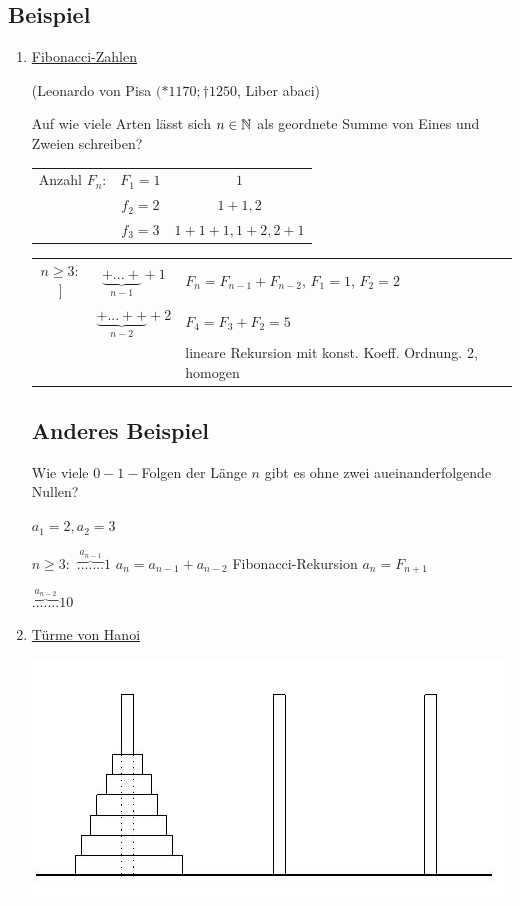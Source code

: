 \subsection{Beispiel}
\begin{enumerate}
	\item \underline{Fibonacci-Zahlen}
	
	(Leonardo von Pisa $(*1170 ; \dagger1250$, Liber abaci)
	
	Auf wie viele Arten lässt sich $n \in \operatorname{\mathbb{N}}$ als geordnete Summe von Eines und Zweien schreiben?
	
	
	\begin{tabular}{c c c}
		Anzahl $F_n$:	& $F_1=1$ 	& $1$\\
						& $f_2=2$	& $1+1,2$\\
						& $f_3=3$	& $1+1+1,1+2,2+1$\\
	\end{tabular}
	
	\begin{tabular}{c c l}
		$n\geq 3:$] 	&$\underbrace{+...+}_{n-1}+1$ & $F_n = F_{n-1}+F_{n-2}$, $F_1=1$, $F_2=2$\\
						&$\underbrace{+...++}_{n-2}+2$ &$F_4 = F_3+F_2 = 5$\\
						&								& lineare Rekursion mit konst. Koeff. Ordnung. 2, homogen 
	\end{tabular}
	\subsection*{Anderes Beispiel}
	Wie viele $0-1-$Folgen der Länge $n$ gibt es ohne zwei aueinanderfolgende Nullen?
	
	$a_1=2, a_2=3$
	
	$n\geq 3:$ $\overbrace{.......}^{a_{n-1}}1$ $a_n = a_{n-1}+a_{n-2}$ Fibonacci-Rekursion \quad $a_n=F_{n+1}$
	
	\qquad \quad $\overbrace{.......}^{a_{n-2}}10$
	 
	 
	 \item \underline{Türme von Hanoi}
	 \begin{center}
		 \includegraphics{hanoi.jpg}
	 \end{center}


\end{enumerate}
